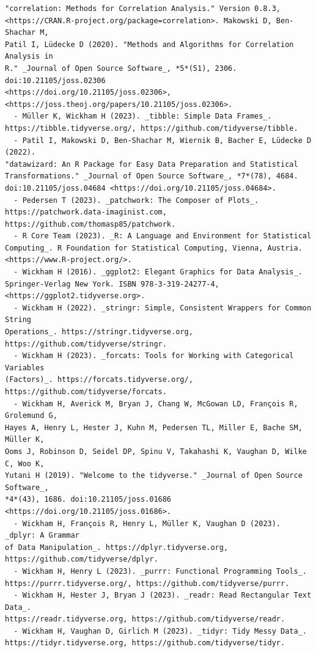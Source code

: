 \documentclass[
  10pt]{article}
\begin{document}
\begin{tcolorbox}[enhanced jigsaw, breakable, leftrule=.75mm, toprule=.15mm, colback=white, rightrule=.15mm, bottomrule=.15mm, opacityback=0, arc=.35mm, left=2mm, colframe=quarto-callout-color-frame]
\begin{verbatim}
"correlation: Methods for Correlation Analysis." Version 0.8.3,
<https://CRAN.R-project.org/package=correlation>. Makowski D, Ben-Shachar M,
Patil I, Lüdecke D (2020). "Methods and Algorithms for Correlation Analysis in
R." _Journal of Open Source Software_, *5*(51), 2306. doi:10.21105/joss.02306
<https://doi.org/10.21105/joss.02306>,
<https://joss.theoj.org/papers/10.21105/joss.02306>.
  - Müller K, Wickham H (2023). _tibble: Simple Data Frames_.
https://tibble.tidyverse.org/, https://github.com/tidyverse/tibble.
  - Patil I, Makowski D, Ben-Shachar M, Wiernik B, Bacher E, Lüdecke D (2022).
"datawizard: An R Package for Easy Data Preparation and Statistical
Transformations." _Journal of Open Source Software_, *7*(78), 4684.
doi:10.21105/joss.04684 <https://doi.org/10.21105/joss.04684>.
  - Pedersen T (2023). _patchwork: The Composer of Plots_.
https://patchwork.data-imaginist.com, https://github.com/thomasp85/patchwork.
  - R Core Team (2023). _R: A Language and Environment for Statistical
Computing_. R Foundation for Statistical Computing, Vienna, Austria.
<https://www.R-project.org/>.
  - Wickham H (2016). _ggplot2: Elegant Graphics for Data Analysis_.
Springer-Verlag New York. ISBN 978-3-319-24277-4,
<https://ggplot2.tidyverse.org>.
  - Wickham H (2022). _stringr: Simple, Consistent Wrappers for Common String
Operations_. https://stringr.tidyverse.org,
https://github.com/tidyverse/stringr.
  - Wickham H (2023). _forcats: Tools for Working with Categorical Variables
(Factors)_. https://forcats.tidyverse.org/,
https://github.com/tidyverse/forcats.
  - Wickham H, Averick M, Bryan J, Chang W, McGowan LD, François R, Grolemund G,
Hayes A, Henry L, Hester J, Kuhn M, Pedersen TL, Miller E, Bache SM, Müller K,
Ooms J, Robinson D, Seidel DP, Spinu V, Takahashi K, Vaughan D, Wilke C, Woo K,
Yutani H (2019). "Welcome to the tidyverse." _Journal of Open Source Software_,
*4*(43), 1686. doi:10.21105/joss.01686 <https://doi.org/10.21105/joss.01686>.
  - Wickham H, François R, Henry L, Müller K, Vaughan D (2023). _dplyr: A Grammar
of Data Manipulation_. https://dplyr.tidyverse.org,
https://github.com/tidyverse/dplyr.
  - Wickham H, Henry L (2023). _purrr: Functional Programming Tools_.
https://purrr.tidyverse.org/, https://github.com/tidyverse/purrr.
  - Wickham H, Hester J, Bryan J (2023). _readr: Read Rectangular Text Data_.
https://readr.tidyverse.org, https://github.com/tidyverse/readr.
  - Wickham H, Vaughan D, Girlich M (2023). _tidyr: Tidy Messy Data_.
https://tidyr.tidyverse.org, https://github.com/tidyverse/tidyr.
\end{verbatim}

\end{tcolorbox}
\end{document}
